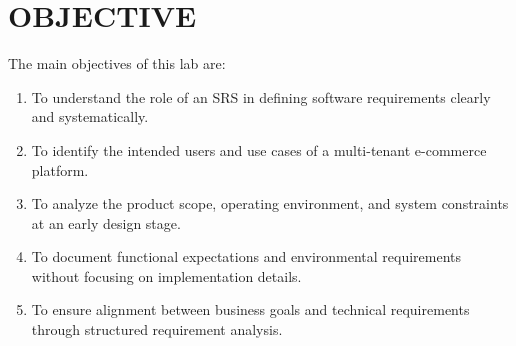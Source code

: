 \chapter{OBJECTIVE}\label{obj}


The main objectives of this lab are:
\begin{enumerate}
    \item To understand the role of an SRS in defining software requirements clearly and systematically.
    \item To identify the intended users and use cases of a multi-tenant e-commerce platform.
    \item To analyze the product scope, operating environment, and system constraints at an early design stage.
    \item To document functional expectations and environmental requirements without focusing on implementation details.
    \item To ensure alignment between business goals and technical requirements through structured requirement analysis.
\end{enumerate}
\clearpage








